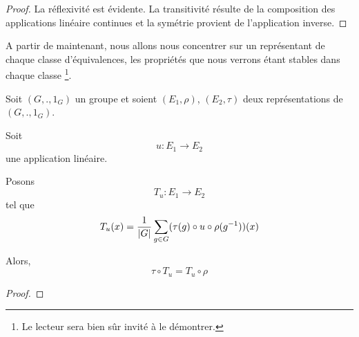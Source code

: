 \ifdefined\outputproof
\begin{proof}
	La réflexivité est évidente. La transitivité résulte de la composition des
	applications linéaire continues et la symétrie provient de l'application
	inverse.
\end{proof}
\fi

A partir de maintenant, nous allons nous concentrer sur un représentant de
chaque classe d'équivalences, les propriétés que nous verrons étant stables dans
chaque classe \footnote{Le lecteur sera bien sûr invité à le démontrer.}.

\begin{proposition}
	Soit $(G, ., 1_{G})$ un groupe et soient $(E_{1},
	\rho)$, $(E_{2}, \tau)$ deux représentations de $(G, ., 1_{G})$.

	Soit
	\begin{equation}
		u : E_{1} \rightarrow E_{2}
	\end{equation}
	une application linéaire.

	Posons
	\begin{equation}
		T_{u} : E_{1} \rightarrow E_{2}
	\end{equation}
	tel que
	\begin{equation}
		T_{u}(x) = \frac{1}{|G|} \sum_{g \in G} (\tau(g) \circ u \circ
		\rho(g^{-1})) (x)
	\end{equation}

	Alors,
	\begin{equation}
		\tau \circ T_{u} = T_{u} \circ \rho
	\end{equation}
\end{proposition}

\ifdefined\outputproof
\begin{proof}

\end{proof}
\fi





